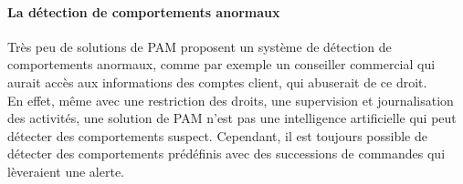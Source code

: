 \paragraph{La détection de comportements anormaux}
Très peu de solutions de PAM proposent un système de détection de comportements anormaux, comme par exemple un conseiller commercial qui aurait accès aux informations des comptes client, qui abuserait de ce droit.\\
En effet, même avec une restriction des droits, une supervision et journalisation des activités, une solution de PAM n'est pas une intelligence artificielle qui peut détecter des comportements suspect. Cependant, il est toujours possible de détecter des comportements prédéfinis avec des successions de commandes qui lèveraient une alerte.

